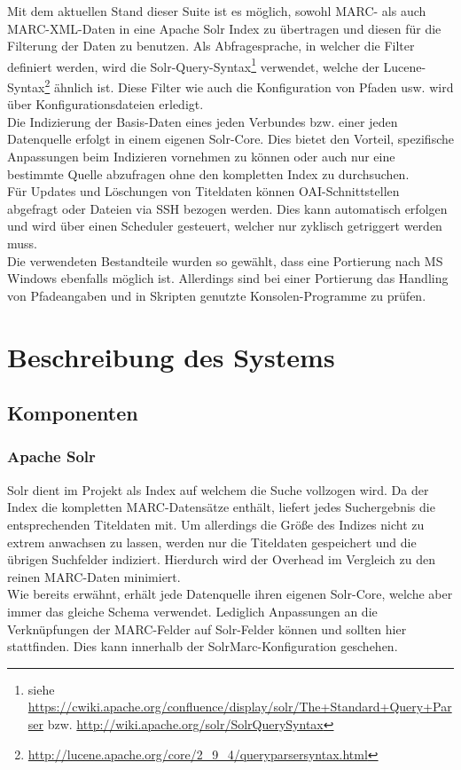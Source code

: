 \documentclass[10pt]{article}
\begin{document}
Mit dem aktuellen Stand dieser Suite ist es möglich, sowohl MARC- als auch MARC-XML-Daten in eine Apache Solr Index zu übertragen und diesen für die Filterung der Daten zu benutzen. Als Abfragesprache, in welcher die Filter definiert werden, wird die Solr-Query-Syntax\footnote{siehe \url{https://cwiki.apache.org/confluence/display/solr/The+Standard+Query+Parser} bzw. \url{http://wiki.apache.org/solr/SolrQuerySyntax}} verwendet, welche der Lucene-Syntax\footnote{\url{http://lucene.apache.org/core/2_9_4/queryparsersyntax.html}} ähnlich ist. Diese Filter wie auch die Konfiguration von Pfaden usw. wird über Konfigurationsdateien erledigt. \\
Die Indizierung der Basis-Daten eines jeden Verbundes bzw. einer jeden Datenquelle erfolgt in einem eigenen Solr-Core. Dies bietet den Vorteil, spezifische Anpassungen beim Indizieren vornehmen zu können oder auch nur eine bestimmte Quelle abzufragen ohne den kompletten Index zu durchsuchen. \\
Für Updates und Löschungen von Titeldaten können OAI-Schnittstellen abgefragt oder Dateien via SSH bezogen werden. Dies kann automatisch erfolgen und wird über einen Scheduler gesteuert, welcher nur zyklisch getriggert werden muss. \\
Die verwendeten Bestandteile wurden so gewählt, dass eine Portierung nach MS Windows ebenfalls möglich ist. Allerdings sind bei einer Portierung das Handling von Pfadeangaben und in Skripten genutzte Konsolen-Programme zu prüfen.

\newpage
\section{Beschreibung des Systems}
\subsection{Komponenten}
\subsubsection{Apache Solr}
Solr dient im Projekt als Index auf welchem die Suche vollzogen wird. Da der Index die kompletten MARC-Datensätze enthält, liefert jedes Suchergebnis die entsprechenden Titeldaten mit. Um allerdings die Größe des Indizes nicht zu extrem anwachsen zu lassen, werden nur die Titeldaten gespeichert und die übrigen Suchfelder indiziert. Hierdurch wird der Overhead im Vergleich zu den reinen MARC-Daten minimiert. \\
Wie bereits erwähnt, erhält jede Datenquelle ihren eigenen Solr-Core, welche aber immer das gleiche Schema verwendet. Lediglich Anpassungen an die Verknüpfungen der MARC-Felder auf Solr-Felder können und sollten hier stattfinden. Dies kann innerhalb der SolrMarc-Konfiguration geschehen.
\end{document}
